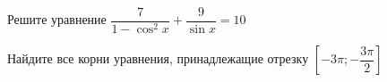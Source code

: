 \begin{ex}
	\begin{condition}
		\begin{enumcols}[label=\asbuk*)]
			\item Решите уравнение \( \dfrac{7}{1 - \cos^2 x} + \dfrac{9}{\sin x } = 10 \)
			\item Найдите все корни уравнения, принадлежащие отрезку \( \left[-3\pi;-\dfrac{3\pi}{2}\right] \)
		\end{enumcols}
	\end{condition}
\end{ex}